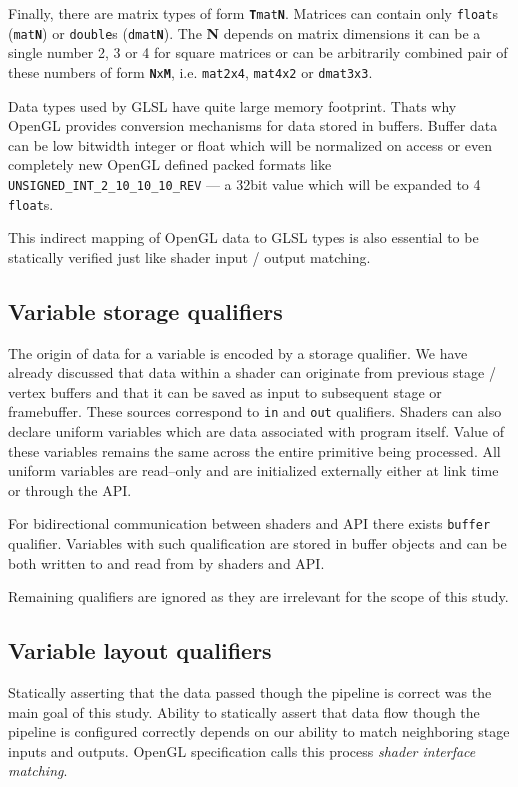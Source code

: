 Finally, there are matrix types of form \texttt{\textbf{T}mat\textbf{N}}. Matrices can contain only \texttt{float}s (\texttt{mat\textbf{N}}) or \texttt{double}s (\texttt{dmat\textbf{N}}).
The \textbf{N} depends on matrix dimensions it can be a single number 2, 3 or 4 for square matrices or can be arbitrarily combined pair of these numbers of form \texttt{\textbf{N}x\textbf{M}},
i.e. \texttt{mat2x4}, \texttt{mat4x2} or \texttt{dmat3x3}.

Data types used by GLSL have quite large memory footprint. Thats why OpenGL provides conversion mechanisms for data stored in buffers. Buffer data can be low bitwidth integer or float which will be normalized on access or even completely 
new OpenGL defined packed formats like \texttt{UNSIGNED\_INT\_2\_10\_10\_10\_REV} --- a 32bit value which will be expanded to 4 \texttt{float}s. 

This indirect mapping of OpenGL data to GLSL types is also essential to be statically verified just like shader input / output matching.

\subsection{Variable storage qualifiers}

The origin of data for a variable is encoded by a storage qualifier. We have already discussed that data within a shader can originate from previous stage / vertex buffers and that it can be saved as input to subsequent stage or framebuffer.
These sources correspond to \texttt{in} and \texttt{out} qualifiers. 
Shaders can also declare uniform variables which are data associated with program itself. Value of these variables remains the same across the
entire primitive being processed. All uniform variables are read--only and are initialized externally either at link time or through the API.

For bidirectional communication between shaders and API there exists \texttt{buffer} qualifier. Variables with such qualification are stored in buffer objects and can be both written to and read from by shaders and API.

Remaining qualifiers are ignored as they are irrelevant for the scope of this study.

\subsection{Variable layout qualifiers}

Statically asserting that the data passed though the pipeline is correct was the main goal of this study.
Ability to statically assert that data flow though the pipeline is configured correctly depends on our ability to match neighboring stage inputs and outputs.
OpenGL specification calls this process \textit{shader interface matching}.

